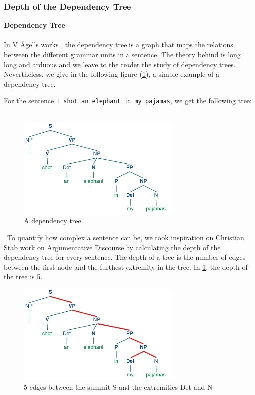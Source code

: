 \subsubsection{Depth of the Dependency Tree}
\textbf{Dependency Tree}
\\
\\
In V {\'A}gel's works \cite{ágel2006dependency}, the dependency tree is a graph that maps the relations between the different grammar units in a sentence. The theory behind is long long and arduous and we leave to the reader the study of dependency trees. Nevertheless, we give in the following figure (\ref{fig:deptree}), a simple example of a dependency tree.

For the sentence \texttt{I shot an elephant in my pajamas}, we get the following tree:
\
\begin{figure}[H]
    \centering
    \includegraphics[width=0.7\textwidth]{fig/deptree.png}
    \caption[Short caption]{A dependency tree}
    \label{fig:deptree}
\end{figure}
\
To quantify how complex a sentence can be, we took inspiration on Christian Stab work on Argumentative Discourse \cite{TUD-CS-2014-0882} by calculating the depth of the dependency tree for every sentence. The depth of a tree is the number of edges between the first node and the furthest extremity in the tree. In \cref{fig:deptree}, the depth of the tree is 5.
\
\begin{figure}[H]
    \centering
    \includegraphics[width=0.7\textwidth]{fig/deptreepath.png}
    \caption[Short caption]{5 edges between the summit S and the extremities Det and N}
    \label{fig:deptreepath}
\end{figure}

